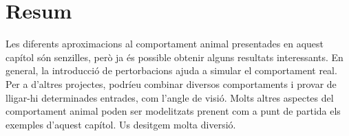 \section{Resum}
Les diferents aproximacions al comportament animal presentades en aquest capítol són senzilles, però ja és possible obtenir alguns resultats interessants. En general, la introducció de pertorbacions ajuda a simular el comportament real. Per a d'altres projectes, podríeu combinar diversos comportaments i provar de lligar-hi determinades entrades, com l'angle de visió. Molts altres aspectes del comportament animal poden ser modelitzats prenent com a punt de partida  els exemples d'aquest capítol. Us desitgem molta diversió.
